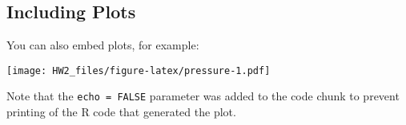 \documentclass[]{article}
\begin{document}
\hypertarget{including-plots}{%
\subsection{Including Plots}\label{including-plots}}

You can also embed plots, for example:

\texttt{[image: HW2\_files/figure-latex/pressure-1.pdf]}

Note that the \texttt{echo\ =\ FALSE} parameter was added to the code
chunk to prevent printing of the R code that generated the plot.
\end{document}

